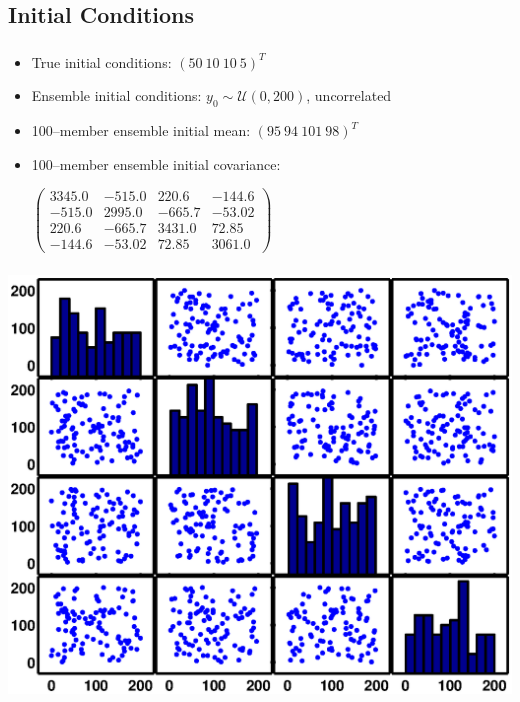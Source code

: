 \documentclass[mathserif]{beamer}
\begin{document}
\subsection{Initial Conditions}

\begin{frame}
\begin{center}
\frametitle{\insertsubsection}
\begin{itemize}
  \item True initial conditions: $(50\ 10\ 10\ 5)^T$
  \item Ensemble initial conditions: $y_0\sim\mathcal{U}(0,200)$, uncorrelated
  \item 100--member ensemble initial mean: $(95\ 94\ 101\ 98)^T$
  \item 100--member ensemble initial covariance:

  $\left(\begin{array}{cccc} 3345.0 & -515.0 & 220.6 & -144.6\\ -515.0 & 2995.0 & -665.7 & -53.02\\ 220.6 & -665.7 & 3431.0 & 72.85\\ -144.6 & -53.02 & 72.85 & 3061.0 \end{array}\right)$
\end{itemize}
\end{center}
\end{frame}

\begin{frame}
\begin{center}
\frametitle{\insertsubsection}
\includegraphics[width=1\textwidth]{initcov}
\end{center}
\end{frame}
\end{document}
